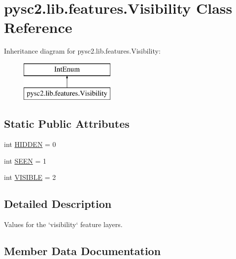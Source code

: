 \hypertarget{classpysc2_1_1lib_1_1features_1_1_visibility}{}\section{pysc2.\+lib.\+features.\+Visibility Class Reference}
\label{classpysc2_1_1lib_1_1features_1_1_visibility}
Inheritance diagram for pysc2.\+lib.\+features.\+Visibility\+:\begin{figure}[H]
\begin{center}
\leavevmode
\includegraphics[height=2.000000cm]{classpysc2_1_1lib_1_1features_1_1_visibility}
\end{center}
\end{figure}
\subsection*{Static Public Attributes}
\begin{DoxyCompactItemize}
\item 
int \mbox{\hyperlink{classpysc2_1_1lib_1_1features_1_1_visibility_a0a6f44d0e4c44d5a3b07c8138575fea4}{H\+I\+D\+D\+EN}} = 0
\item 
int \mbox{\hyperlink{classpysc2_1_1lib_1_1features_1_1_visibility_a61550f519149b951714f3d40ba1adc2c}{S\+E\+EN}} = 1
\item 
int \mbox{\hyperlink{classpysc2_1_1lib_1_1features_1_1_visibility_a51aec684c91aecd2a377fbc645fb6443}{V\+I\+S\+I\+B\+LE}} = 2
\end{DoxyCompactItemize}


\subsection{Detailed Description}
\begin{DoxyVerb}Values for the `visibility` feature layers.\end{DoxyVerb}
 

\subsection{Member Data Documentation}
\mbox{\label{classpysc2_1_1lib_1_1features_1_1_visibility_a0a6f44d0e4c44d5a3b07c8138575fea4}} 
